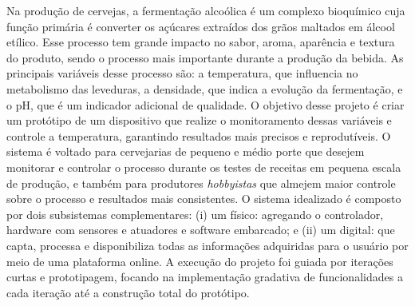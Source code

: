 Na produção de cervejas, a fermentação alcoólica é um complexo bioquímico cuja função primária é converter os açúcares extraídos dos grãos maltados em álcool etílico. Esse processo tem grande impacto no sabor, aroma, aparência e textura do produto, sendo o processo mais importante durante a produção da bebida. 
As principais variáveis desse processo são: a temperatura, que influencia no metabolismo das leveduras, a densidade, que indica a evolução da fermentação, e o pH, que é um indicador adicional de qualidade. 
O objetivo desse projeto é criar um protótipo de um dispositivo que realize o monitoramento dessas variáveis e controle a temperatura, garantindo resultados mais precisos e reprodutíveis. O sistema é voltado para cervejarias de pequeno e médio porte que desejem monitorar e controlar o processo durante os testes de receitas em pequena escala de produção, e também para produtores \textit{hobbyistas} que almejem maior controle sobre o processo e resultados mais consistentes. 
O sistema idealizado é composto por dois subsistemas complementares: (i) um físico: agregando o controlador, hardware com sensores e atuadores e software embarcado; e (ii) um digital: que capta, processa e disponibiliza todas as informações adquiridas para o usuário por meio de uma plataforma online. A execução do projeto foi guiada por iterações curtas e prototipagem, focando na implementação gradativa de funcionalidades a cada iteração até a construção total do protótipo.
